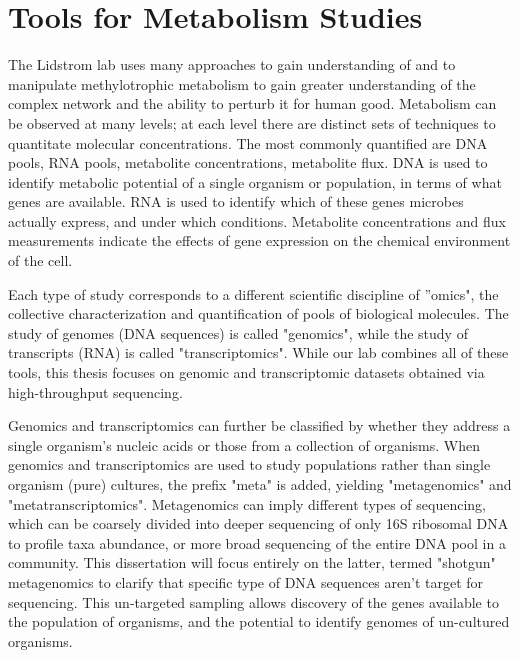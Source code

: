 \section{Tools for Metabolism Studies}
The Lidstrom lab uses many approaches to gain understanding of and to manipulate methylotrophic metabolism to gain greater understanding of the complex network and the ability to perturb it for human good.
Metabolism can be observed at many levels; at each level there are distinct sets of techniques to quantitate molecular concentrations.
The most commonly quantified are DNA pools, RNA pools, metabolite concentrations, metabolite flux.
DNA is used to identify metabolic potential of a single organism or population, in terms of what genes are available.
RNA is used to identify which of these genes microbes actually express, and under which conditions.
Metabolite concentrations and flux measurements indicate the effects of gene expression on the chemical environment of the cell.

Each type of study corresponds to a different scientific discipline of ''omics", the collective characterization and quantification of pools of biological molecules.
The study of genomes (DNA sequences) is called "genomics", while the study of transcripts (RNA) is called "transcriptomics".
While our lab combines all of these tools, this thesis focuses on genomic and transcriptomic datasets obtained via high-throughput sequencing.


Genomics and transcriptomics can further be classified by whether they address a single organism's nucleic acids or those from a collection of organisms.
When genomics and transcriptomics are used to study populations rather than single organism (pure) cultures, the prefix "meta" is added, yielding "metagenomics" and "metatranscriptomics".
Metagenomics can imply different types of sequencing, which can be coarsely divided into deeper sequencing of only 16S ribosomal DNA to profile taxa abundance, or more broad sequencing of the entire DNA pool in a community.
This dissertation will focus entirely on the latter, termed "shotgun" metagenomics to clarify that specific type of DNA sequences aren't target for sequencing.
This un-targeted sampling allows discovery of the genes available to the population of organisms, and the potential to identify genomes of un-cultured organisms.

